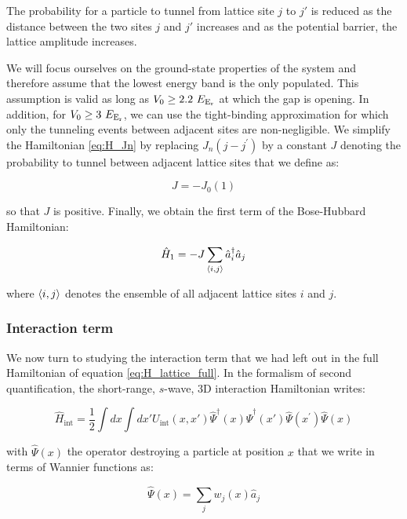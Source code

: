 \noindent The probability for a particle to tunnel from lattice site $j$ to $j'$ is reduced as the distance between the two sites $j$ and $j'$ increases and as the potential barrier, \ie the lattice amplitude increases.

We will focus ourselves on the ground-state properties of the system and therefore assume that the lowest energy band is the only populated. This assumption is valid as long as $V_0 \geq 2.2 \ E_{\rm{E_r}}$ at which the gap is opening. In addition, for $V_0 \geq 3 \ E_{\rm{E_r}}$, we can use the tight-binding approximation for which only the tunneling events between adjacent sites are non-negligible. We simplify the Hamiltonian \ref{eq:H_Jn} by replacing  $J_{n}\left(j-j^{\prime}\right)$ by a constant $J$ denoting the probability to tunnel between adjacent lattice sites that we define as:

\begin{equation}
    J=-J_0(1)
\end{equation}

\noindent so that $J$ is positive. Finally, we obtain the first term of the Bose-Hubbard Hamiltonian:

\begin{equation}
    \hat{H}_1 = -J \sum_{\left\langle i,j\right\rangle} \hat{a}^{\dagger}_i \hat{a}_j
    \label{eq:H_band}
\end{equation}

\noindent where $\left\langle i,j\right\rangle$ denotes the ensemble of all adjacent lattice sites $i$ and $j$.

\subsubsection{Interaction term}
We now turn to studying the interaction term that we had left out in the full Hamiltonian of equation \ref{eq:H_lattice_full}. In the formalism of second quantification, the short-range, $s$-wave, 3D interaction Hamiltonian writes:

\begin{equation}
    \hat{H}_{\mathrm{int}}=\frac{1}{2} \int d x \int d x' U_{\mathrm{int}}\left(x, x'\right) \hat{\Psi}^{\dagger}(x) \hat{\Psi}^{\dagger}\left(x'\right) \hat{\Psi}\left(x^{\prime}\right) \hat{\Psi}(x)
\end{equation}

\noindent with $\hat{\Psi}(x)$ the operator destroying a particle at position $x$ that we write in terms of Wannier functions as:

\begin{equation}
    \hat{\Psi}(x)=\sum_{j} w_{j}(x) \hat{a}_{j}
\end{equation}


